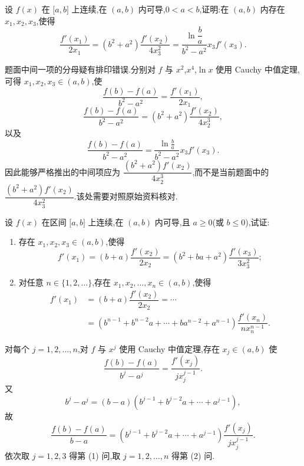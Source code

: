 \begin{example}
    设 $f(x)$ 在 $\lbrack a,b\rbrack$ 上连续,在 $(a,b)$ 内可导,$0<a<b$,证明:在 $(a,b)$ 内存在 $x_1,x_2,x_3$,使得
    \[
        \dfrac{f'(x_1)}{2x_1}
        =(b^2+a^2)\dfrac{f'(x_2)}{4x_3^2}
        =\dfrac{\ln\dfrac{b}{a}}{b^2-a^2}x_3f'(x_3).
    \]
\end{example}
\exampleblank

\begin{solution}
    题面中间一项的分母疑有排印错误.分别对 $f$ 与 $x^2$,$x^4$,$\ln x$ 使用 Cauchy 中值定理,可得 $x_1,x_2,x_3\in(a,b)$,使
    \[
        \dfrac{f(b)-f(a)}{b^2-a^2}
        =\dfrac{f'(x_1)}{2x_1},
    \]
    \[
        \dfrac{f(b)-f(a)}{b^2-a^2}
        =(b^2+a^2)\dfrac{f'(x_2)}{4x_2^3},
    \]
    以及
    \[
        \dfrac{f(b)-f(a)}{b^2-a^2}
        =\dfrac{\ln\frac{b}{a}}{b^2-a^2}x_3f'(x_3).
    \]
    因此能够严格推出的中间项应为 $\dfrac{(b^2+a^2)f'(x_2)}{4x_2^3}$,而不是当前题面中的 $\dfrac{(b^2+a^2)f'(x_2)}{4x_3^2}$.该处需要对照原始资料核对.
\end{solution}

\begin{example}
    设 $f(x)$ 在区间 $\lbrack a,b\rbrack$ 上连续,在 $(a,b)$ 内可导,且 $a\geq0$(或 $b\leq0$),试证:
    \begin{enumerate}
        \item 存在 $x_1,x_2,x_3\in(a,b)$,使得
              \[
                  f'(x_1)
                  =(b+a)\dfrac{f'(x_2)}{2x_2}
                  =(b^2+ba+a^2)\dfrac{f'(x_3)}{3x_3^2};
              \]
        \item 对任意 $n\in\{1,2,\ldots\}$,存在 $x_1,x_2,\ldots,x_n\in(a,b)$,使得
              \[
                  \begin{aligned}
                      f'(x_1)
                       & =(b+a)\dfrac{f'(x_2)}{2x_2}
                      =\cdots                                        \\
                       & =(b^{n-1}+b^{n-2}a+\cdots+ba^{n-2}+a^{n-1})
                      \dfrac{f'(x_n)}{nx_n^{n-1}}.
                  \end{aligned}
              \]
    \end{enumerate}
\end{example}
\exampleblank

\begin{solution}
    对每个 $j=1,2,\ldots,n$,对 $f$ 与 $x^j$ 使用 Cauchy 中值定理,存在 $x_j\in(a,b)$ 使
    \[
        \dfrac{f(b)-f(a)}{b^j-a^j}
        =\dfrac{f'(x_j)}{jx_j^{j-1}}.
    \]
    又
    \[
        b^j-a^j=(b-a)(b^{j-1}+b^{j-2}a+\cdots+a^{j-1}),
    \]
    故
    \[
        \dfrac{f(b)-f(a)}{b-a}
        =(b^{j-1}+b^{j-2}a+\cdots+a^{j-1})
        \dfrac{f'(x_j)}{jx_j^{j-1}}.
    \]
    依次取 $j=1,2,3$ 得第 (1) 问,取 $j=1,2,\ldots,n$ 得第 (2) 问.
\end{solution}


